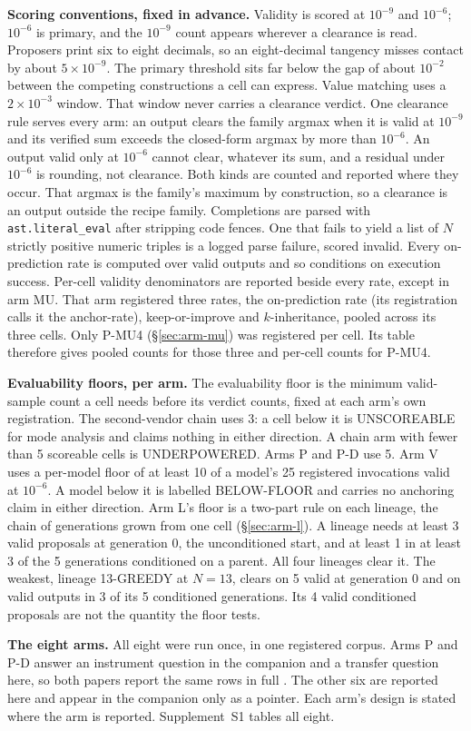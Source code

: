 \textbf{Scoring conventions, fixed in advance.} Validity is scored at $10^{-9}$ and
$10^{-6}$; $10^{-6}$ is primary, and the $10^{-9}$ count appears wherever a clearance is
read. Proposers print six to eight decimals, so an
eight-decimal tangency misses contact by about $5\times10^{-9}$. The primary threshold sits far
below the gap of about $10^{-2}$ between the competing constructions a cell can express. Value
matching uses a $2\times10^{-3}$ window. That window never carries a clearance verdict. One
clearance rule serves every arm: an output clears the family argmax when it is valid at
$10^{-9}$ and its verified sum exceeds the closed-form argmax by more than $10^{-6}$. An output
valid only at $10^{-6}$ cannot clear, whatever its sum, and a residual under $10^{-6}$ is
rounding, not clearance. Both kinds are counted and reported where they occur. That argmax is
the family's maximum by construction,
so a clearance is an output outside the recipe family. Completions are parsed with \texttt{ast.literal\_eval}
after stripping code fences. One that fails to yield a list of $N$ strictly positive numeric
triples is a logged parse failure, scored invalid. Every on-prediction rate is computed over
valid outputs and so conditions on execution success. Per-cell validity denominators are
reported beside every rate, except in arm MU. That arm registered three rates, the
on-prediction rate (its registration calls it the anchor-rate), keep-or-improve and $k$-inheritance, pooled across its three cells. Only
P-MU4 (\S\ref{sec:arm-mu}) was registered per cell. Its table therefore gives
pooled counts for those three and per-cell counts for P-MU4.

\textbf{Evaluability floors, per arm.} The evaluability floor is the minimum
valid-sample count a cell needs before its verdict counts, fixed at each arm's own
registration. The second-vendor chain uses 3: a cell below it is UNSCOREABLE for mode analysis
and claims nothing in either direction. A chain arm with fewer than 5 scoreable cells is
UNDERPOWERED. Arms P and P-D use 5. Arm V uses a per-model floor of
at least 10 of a model's 25 registered invocations valid at $10^{-6}$. A model below it is
labelled BELOW-FLOOR and carries no anchoring claim in either direction. Arm L's floor is a
two-part rule on each lineage, the chain of generations grown from one cell
(\S\ref{sec:arm-l}). A lineage needs at least 3 valid proposals at generation 0, the
unconditioned start, and at least 1 in at least 3 of the 5 generations conditioned on a
parent. All four lineages clear it. The weakest, lineage 13-GREEDY at $N = 13$, clears on 5
valid at generation 0 and on valid outputs in 3 of its 5 conditioned generations. Its 4 valid
conditioned proposals are not the quantity the floor tests.

\textbf{The eight arms.} All eight were run once, in one registered corpus. Arms P and P-D
answer an instrument question in the companion and a transfer question here, so both papers
report the same rows in full \citep{companion}. The other six are reported here and appear in
the companion only as a pointer.
Each arm's design is stated where the arm is reported. Supplement~S1 tables all eight.
